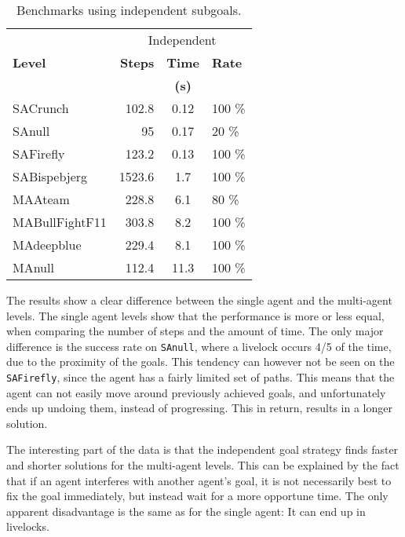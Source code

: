 \documentclass[letterpaper]{article}
\begin{document}
		\begin{table}
			\centering
			\begin{tabular}{ l | r | c | l }
								&	\multicolumn{3}{c}{Independent}		\\
				\textbf{Level}	&	\textbf{Steps}	&	\textbf{Time}	&	\textbf{Rate}	\\				
								&					&	\textbf{(s)}	&					\\
				\hline
				SACrunch		&	102.8		&	0.12	& 	100 \%	\\
				SAnull			&	95			&	0.17	&	20 	\% 	\\
				SAFirefly		& 	123.2		&	0.13	& 	100 \%	\\
				SABispebjerg	&	1523.6		&	1.7		&	100 \% 	\\
				MAAteam			&	228.8		&	6.1		& 	80 	\%	\\
				MABullFightF11	&	303.8		&	8.2		& 	100 \% 	\\
				MAdeepblue		&	229.4		&	8.1		&	100 \% 	\\
				MAnull			&	112.4		&	11.3	& 	100 \% 	\\
				
			\end{tabular}
			\caption{Benchmarks using independent subgoals.}
			\label{table:bench_cumgoals}
		\end{table}


		The results show a clear difference between the single agent and the multi-agent levels. 
		The single agent levels show that the performance is more or less equal, when comparing the number of steps and the amount of time. The only major difference is the success rate on \verb=SAnull=, where a livelock occurs 4/5 of the time, due to the proximity of the goals. This tendency can however not be seen on the \verb|SAFirefly|, since the agent has a fairly limited set of paths. This means that the agent can not easily move around previously achieved goals, and unfortunately ends up undoing them, instead of progressing. This in return, results in a longer solution.

		
		The interesting part of the data is that the independent goal strategy finds faster and shorter solutions for the multi-agent levels. This can be explained by the fact that if an agent interferes with another agent's goal, it is not necessarily best to fix the goal immediately, but instead wait for a more opportune time. The only apparent disadvantage is the same as for the single agent: It can end up in livelocks.
		
\end{document}
